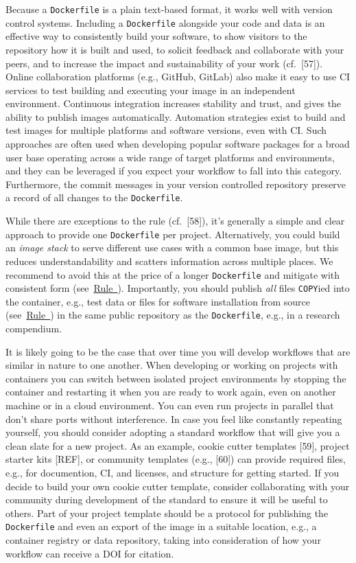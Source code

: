 \documentclass[10pt,letterpaper]{article}
\begin{document}
Because a \texttt{Dockerfile} is a plain text-based format, it works
well with version control systems. Including a \texttt{Dockerfile}
alongside your code and data is an effective way to consistently build
your software, to show visitors to the repository how it is built and
used, to solicit feedback and collaborate with your peers, and to
increase the impact and sustainability of your work (cf.~{[}57{]}).
Online collaboration platforms (e.g., GitHub, GitLab) also make it easy
to use CI services to test building and executing your image in an
independent environment. Continuous integration increases stability and
trust, and gives the ability to publish images automatically. Automation
strategies exist to build and test images for multiple platforms and
software versions, even with CI. Such approaches are often used when
developing popular software packages for a broad user base operating
across a wide range of target platforms and environments, and they can
be leveraged if you expect your workflow to fall into this category.
Furthermore, the commit messages in your version controlled repository
preserve a record of all changes to the \texttt{Dockerfile}.

While there are exceptions to the rule (cf.~{[}58{]}), it's generally a
simple and clear approach to provide one \texttt{Dockerfile} per
project. Alternatively, you could build an \emph{image stack} to serve
different use cases with a common base image, but this reduces
understandability and scatters information across multiple places. We
recommend to avoid this at the price of a longer \texttt{Dockerfile} and
mitigate with consistent form
(see~\hyperref[{rule:formatting}]{Rule~}).
Importantly, you should publish \emph{all} files \texttt{COPY}ied into
the container, e.g., test data or files for software installation from
source (see~\hyperref[{rule:mount}]{Rule~}) in the
same public repository as the \texttt{Dockerfile}, e.g., in a research
compendium.

It is likely going to be the case that over time you will develop
workflows that are similar in nature to one another. When developing or
working on projects with containers you can switch between isolated
project environments by stopping the container and restarting it when
you are ready to work again, even on another machine or in a cloud
environment. You can even run projects in parallel that don't share
ports without interference. In case you feel like constantly repeating
yourself, you should consider adopting a standard workflow that will
give you a clean slate for a new project. As an example, cookie cutter
templates {[}59{]}, project starter kits {[}REF{]}, or community
templates (e.g., {[}60{]}) can provide required files, e.g., for
documention, CI, and licenses, and structure for getting started. If you
decide to build your own cookie cutter template, consider collaborating
with your community during development of the standard to ensure it will
be useful to others. Part of your project template should be a protocol
for publishing the \texttt{Dockerfile} and even an export of the image
in a suitable location, e.g., a container registry or data repository,
taking into consideration of how your workflow can receive a DOI for
citation.
\end{document}
